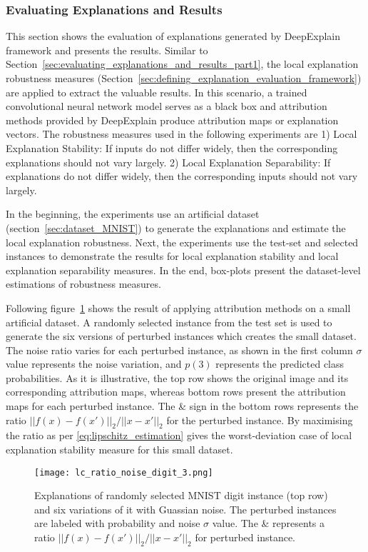 \documentclass[english]{tktltiki2}
\theoremstyle{definition}
\theoremstyle{remark}
\begin{document}
\subsubsection{Evaluating Explanations and Results}\label{sec:CNN_evaluating_explnations_and_resuls}
This section shows the evaluation of explanations generated by DeepExplain framework and presents the results. Similar to Section~\ref{sec:evaluating_explanations_and_results_part1}, the local explanation robustness measures (Section~\ref{sec:defining_explanation_evaluation_framework}) are applied to extract the valuable results. In this scenario, a trained convolutional neural network model serves as a black box and attribution methods provided by DeepExplain produce attribution maps or explanation vectors. The robustness measures used in the following experiments are 1) Local Explanation Stability: If inputs do not differ widely, then the corresponding explanations should not vary largely. 2) Local Explanation Separability: If explanations do not differ widely, then the corresponding inputs should not vary largely.

In the beginning, the experiments use an artificial dataset (section~\ref{sec:dataset_MNIST}) to generate the explanations and estimate the local explanation robustness.  Next, the experiments use the test-set and selected instances to demonstrate the results for local explanation stability and local explanation separability measures. In the end, box-plots present the dataset-level estimations of robustness measures.

Following figure~\ref{fig:digit3_noise_ratio} shows the result of applying attribution methods on a small artificial dataset. A randomly selected instance from the test set is used to generate the six versions of perturbed instances which creates the small dataset. The noise ratio varies for each perturbed instance, as shown in the first column $\sigma$ value represents the noise variation, and $p(3)$ represents the predicted class probabilities. As it is illustrative, the top row shows the original image and its corresponding attribution maps, whereas bottom rows present the attribution maps for each perturbed instance. The \& sign in the bottom rows represents the ratio $||f(x) - f(x\prime)||_2/||x - x\prime||_2$ for the perturbed instance. By maximising the ratio as per \eqref{eq:lipschitz_estimation} gives the worst-deviation case of local explanation stability measure for this small dataset.

\begin{figure}[H]
	\vspace*{0mm}
	\centering
	\texttt{[image: lc\_ratio\_noise\_digit\_3.png]}
	\caption{Explanations of randomly selected MNIST digit instance (top row) and six variations of it with Guassian noise. The perturbed instances are labeled with probability and noise $\sigma$ value. The \& represents a ratio $||f(x) - f(x\prime)||_2/||x - x\prime||_2$ for perturbed instance.}%
	\label{fig:digit3_noise_ratio}%
\end{figure}
\end{document}
